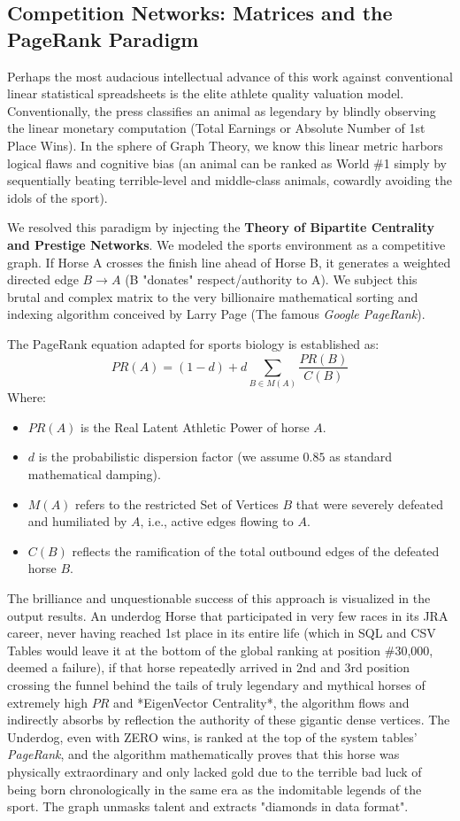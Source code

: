 \documentclass[12pt,a4paper]{article}
\begin{document}
\subsection{Competition Networks: Matrices and the PageRank Paradigm}
Perhaps the most audacious intellectual advance of this work against conventional linear statistical spreadsheets is the elite athlete quality valuation model.
Conventionally, the press classifies an animal as legendary by blindly observing the linear monetary computation (Total Earnings or Absolute Number of 1st Place Wins). In the sphere of Graph Theory, we know this linear metric harbors logical flaws and cognitive bias (an animal can be ranked as World \#1 simply by sequentially beating terrible-level and middle-class animals, cowardly avoiding the idols of the sport).

We resolved this paradigm by injecting the \textbf{Theory of Bipartite Centrality and Prestige Networks}. We modeled the sports environment as a competitive graph. If Horse A crosses the finish line ahead of Horse B, it generates a weighted directed edge $B \to A$ (B "donates" respect/authority to A). We subject this brutal and complex matrix to the very billionaire mathematical sorting and indexing algorithm conceived by Larry Page (The famous \textit{Google PageRank}).

The PageRank equation adapted for sports biology is established as:
\[ PR(A) = (1-d) + d \sum_{B \in M(A)} \frac{PR(B)}{C(B)} \]
Where:
\begin{itemize}
    \item $PR(A)$ is the Real Latent Athletic Power of horse $A$.
    \item $d$ is the probabilistic dispersion factor (we assume $0.85$ as standard mathematical damping).
    \item $M(A)$ refers to the restricted Set of Vertices $B$ that were severely defeated and humiliated by $A$, i.e., active edges flowing to $A$.
    \item $C(B)$ reflects the ramification of the total outbound edges of the defeated horse $B$.
\end{itemize}

The brilliance and unquestionable success of this approach is visualized in the output results. An underdog Horse that participated in very few races in its JRA career, never having reached 1st place in its entire life (which in SQL and CSV Tables would leave it at the bottom of the global ranking at position \#30,000, deemed a failure), if that horse repeatedly arrived in 2nd and 3rd position crossing the funnel behind the tails of truly legendary and mythical horses of extremely high $PR$ and *EigenVector Centrality*, the algorithm flows and indirectly absorbs by reflection the authority of these gigantic dense vertices. The Underdog, even with ZERO wins, is ranked at the top of the system tables' \textit{PageRank}, and the algorithm mathematically proves that this horse was physically extraordinary and only lacked gold due to the terrible bad luck of being born chronologically in the same era as the indomitable legends of the sport. The graph unmasks talent and extracts "diamonds in data format".
\end{document}
